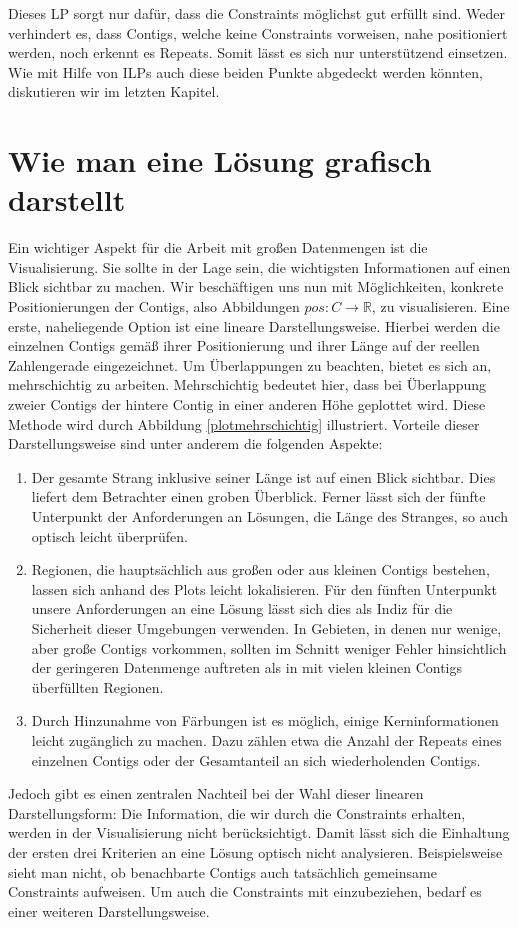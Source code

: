 Dieses LP sorgt nur dafür, dass die Constraints möglichst gut erfüllt sind. Weder verhindert es, dass Contigs, welche keine Constraints vorweisen, nahe positioniert werden, noch erkennt es Repeats. Somit lässt es sich nur unterstützend einsetzen. Wie mit Hilfe von ILPs auch diese beiden Punkte abgedeckt werden könnten, diskutieren wir im letzten Kapitel.
\section{Wie man eine Lösung grafisch darstellt}
Ein wichtiger Aspekt für die Arbeit mit großen Datenmengen ist die Visualisierung.
Sie sollte in der Lage sein, die wichtigsten Informationen auf einen Blick sichtbar zu machen. Wir beschäftigen uns nun mit Möglichkeiten, konkrete Positionierungen der Contigs, also Abbildungen $pos: C \rightarrow \mathbb{R}$, zu visualisieren.
Eine erste, naheliegende Option ist eine lineare Darstellungsweise. Hierbei werden die einzelnen Contigs gemäß ihrer Positionierung und ihrer Länge auf der reellen Zahlengerade eingezeichnet. Um Überlappungen zu beachten, bietet es sich an, mehrschichtig zu arbeiten. Mehrschichtig bedeutet hier, dass bei Überlappung zweier Contigs der hintere Contig in einer anderen Höhe geplottet wird. Diese Methode wird durch Abbildung \ref{plotmehrschichtig} illustriert.
Vorteile dieser Darstellungsweise sind unter anderem die folgenden Aspekte:
\begin{enumerate}
\item Der gesamte Strang inklusive seiner Länge ist auf einen Blick sichtbar. Dies liefert dem Betrachter einen groben Überblick. Ferner lässt sich der fünfte Unterpunkt der Anforderungen an Lösungen, die Länge des Stranges, so auch optisch leicht überprüfen.
\item Regionen, die hauptsächlich aus großen oder aus kleinen Contigs bestehen, lassen sich anhand des Plots leicht lokalisieren. Für den fünften Unterpunkt unsere Anforderungen an eine Lösung lässt sich dies als Indiz für die Sicherheit dieser Umgebungen verwenden. In Gebieten, in denen nur wenige, aber große Contigs vorkommen, sollten im Schnitt weniger Fehler hinsichtlich der geringeren Datenmenge auftreten als in mit vielen kleinen Contigs überfüllten Regionen.
\item Durch Hinzunahme von Färbungen ist es möglich, einige Kerninformationen leicht zugänglich zu machen. Dazu zählen etwa die Anzahl der Repeats eines einzelnen Contigs oder der Gesamtanteil an sich wiederholenden Contigs.
\end{enumerate}
Jedoch gibt es einen zentralen Nachteil bei der Wahl dieser linearen Darstellungsform: Die Information, die wir durch die Constraints erhalten, werden in der Visualisierung nicht berücksichtigt.
Damit lässt sich die Einhaltung der ersten drei Kriterien an eine Lösung optisch nicht analysieren.
Beispielsweise sieht man nicht, ob benachbarte Contigs auch tatsächlich gemeinsame Constraints aufweisen.
Um auch die Constraints mit einzubeziehen, bedarf es einer weiteren Darstellungsweise.

